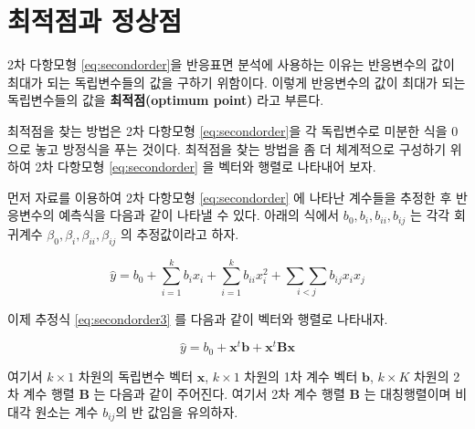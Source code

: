 \documentclass[
]{book}
\newcommand{\bm}[1]{\boldsymbol{\mathbf{#1}}}
\theoremstyle{definition}
\theoremstyle{definition}
\theoremstyle{definition}
\theoremstyle{definition}
\theoremstyle{remark}
\begin{document}
\hypertarget{uxcd5cuxc801uxc810uxacfc-uxc815uxc0c1uxc810}{%
\section{최적점과 정상점}\label{uxcd5cuxc801uxc810uxacfc-uxc815uxc0c1uxc810}}

2차 다항모형 \eqref{eq:secondorder}을 반응표면 분석에 사용하는 이유는 반응변수의 값이 최대가 되는 독립변수들의 값을 구하기 위함이다. 이렇게 반응변수의 값이 최대가 되는 독립변수들의 값을 \textbf{최적점(optimum point)} 라고 부른다.

최적점을 찾는 방법은 2차 다항모형 \eqref{eq:secondorder}을 각 독립변수로 미분한 식을 0으로 놓고 방정식을 푸는 것이다. 최적점을 찾는 방법을 좀 더 체계적으로 구성하기 위하여 2차 다항모형 \eqref{eq:secondorder} 을 벡터와 행렬로 나타내어 보자.

먼저 자료를 이용하여 2차 다항모형 \eqref{eq:secondorder} 에 나타난 계수들을 추정한 후 반응변수의 예측식을 다음과 같이 나타낼 수 있다. 아래의 식에서 \(b_0,b_{i}, b_{ii}, b_{ij}\) 는 각각 회귀계수 \(\beta_0, \beta_{i}, \beta_{ii}, \beta_{ij}\) 의 추정값이라고 하자.

\begin{equation}
\hat y = b_0 + \sum_{i=1}^{k} b_i x_i + \sum_{i=1}^{k} b_{ii} x^2_i + \underset{i<j}{\sum \sum} b_{ij} x_i x_j
\label{eq:secondorder3}
\end{equation}

이제 추정식 \eqref{eq:secondorder3} 를 다음과 같이 벡터와 행렬로 나타내자.

\begin{equation}
\hat y = b_0 + {\bm x}^t \bm b + {\bm x}^t \bm B {\bm x} 
\label{eq:secondordermat}
\end{equation}

여기서 \(k \times 1\) 차원의 독립변수 벡터 \(\bm x\), \(k \times 1\) 차원의 1차 계수 벡터 \(\bm b\), \(k \times K\) 차원의 2차 계수 행렬 \(\bm B\) 는 다음과 같이 주어진다. 여기서 2차 계수 행렬 \(\bm B\) 는 대칭행렬이며 비대각 원소는 계수 \(b_{ij}\)의 반 값임을 유의하자.
\end{document}
